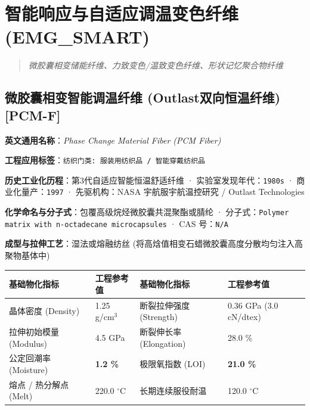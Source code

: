 \documentclass[11pt,openright,twoside,UTF8]{ctexbook}
\begin{document}
\chapter{智能响应与自适应调温变色纤维 (EMG\_SMART)}
\begin{quote}
\small\itshape
微胶囊相变储能纤维、力致变色/温致变色纤维、形状记忆聚合物纤维
\end{quote}

\section{微胶囊相变智能调温纤维 (Outlast双向恒温纤维) [PCM-F]}
\label{sec:pcm-f}

\noindent\textbf{英文通用名称}：\textit{Phase Change Material Fiber (PCM Fiber)}\par
\noindent\textbf{工程应用标签}：\texttt{纺织门类: 服装用纺织品 / 智能穿戴纺织品}\par
\noindent\textbf{历史工业化历程}：第3代自适应智能恒温舒适纤维 · 实验室发现年代：\texttt{1980s} · 商业化量产：\texttt{1997} · 先驱机构：NASA 宇航服宇航温控研究 / Outlast Technologies\par
\noindent\textbf{化学命名与分子式}：包覆高级烷烃微胶囊共混聚酯或腈纶 · 分子式：\texttt{Polymer matrix with n-octadecane microcapsules} · CAS 号：\texttt{N/A}\par
\noindent\textbf{成型与拉伸工艺}：湿法或熔融纺丝 (将高焓值相变石蜡微胶囊高度分散均匀注入高聚物基体中)\par

\vspace{0.15cm}
\begin{center}
\small
\begin{tabularx}{\textwidth}{p{3.8cm}Xp{3.8cm}X}
\toprule
\textbf{基础物化指标} & \textbf{工程参考值} & \textbf{基础物化指标} & \textbf{工程参考值} \\
\midrule
晶体密度 (Density) & 1.25 g/cm$^3$ & 断裂拉伸强度 (Strength) & 0.36 GPa (3.0 cN/dtex) \\
拉伸初始模量 (Modulus) & 4.5 GPa & 断裂伸长率 (Elongation) & 28.0 \% \\
公定回潮率 (Moisture) & \textbf{1.2 \%} & 极限氧指数 (LOI) & \textbf{21.0 \%} \\
熔点 / 热分解点 (Melt) & 220.0 $^\circ\mathrm{C}$ & 长期连续服役耐温 & 120.0 $^\circ\mathrm{C}$ \\
\bottomrule
\end{tabularx}
\end{center}
\vspace{0.15cm}
\end{document}
